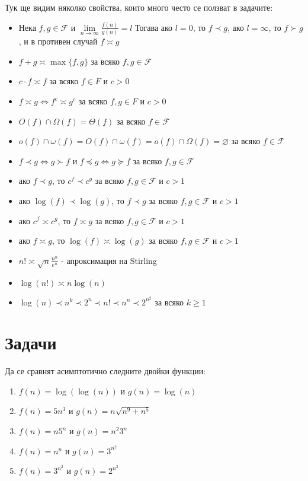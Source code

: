\documentclass{article}
\newcommand{\F}{\mathcal{F}}
\theoremstyle{definition}
\theoremstyle{plain}
\theoremstyle{remark}
\theoremstyle{definition}
\begin{document}
Тук ще видим няколко свойства, които много често се ползват в задачите:
\begin{itemize}
  \item Нека $f, g \in \F$ и $\lim\limits_{n \rightarrow \infty} \frac{f(n)}{g(n)} = l$
    Тогава ако $l = 0$, то $f \prec g$, ако $l = \infty$, то $f \succ g$, и в противен случай $f \asymp g$
  \item $f + g \asymp \max\{f, g\}$ за всяко $f, g \in \F$
  \item $c \cdot f \asymp f$ за всяко $f \in F$ и $c > 0$
  \item $f \asymp g \iff f^c \asymp g^c$ за всяко $f, g \in F$ и $c > 0$
  \item $O(f) \cap \Omega(f) = \Theta(f)$ за всяко $f \in \F$
  \item $o(f) \cap \omega(f) = O(f) \cap \omega(f) = o(f) \cap \Omega(f) = \varnothing$ за всяко $f \in \F$
  \item $f \prec g \iff g \succ f$ и $f \preceq g \iff g \succeq f$ за всяко $f, g \in \F$
  \item ако $f \prec g$, то $c^f \prec c^g$ за всяко $f, g \in \F$ и $c > 1$
  \item ако $\log(f) \prec \log(g)$, то $f \prec g$ за всяко $f, g \in \F$ и $c > 1$
  \item ако $c^f \asymp c^g$, то $f \asymp g$ за всяко $f, g \in \F$ и $c > 1$
  \item ако $f \asymp g$, то $\log(f) \asymp \log(g)$ за всяко $f, g \in \F$ и $c > 1$
  \item $n! \asymp \sqrt{n} \frac{n^n}{e^n}$ - апроксимация на Stirling
  \item $\log(n!) \asymp n \log(n)$
  \item $\log(n) \prec n^k \prec 2^n \prec n! \prec n^n \prec 2^{n^2}$ за всяко $k \geq 1$
\end{itemize}

\section*{Задачи}

Да се сравнят асимптотично следните двойки функции:
\begin{enumerate}
  \item $f(n) = \log(\log(n))$ и $g(n) = \log(n)$
  \item $f(n) = 5n^3$ и $g(n) = n \sqrt{n^9 + n^5}$
  \item $f(n) = n 5^n$ и $g(n) = n^ 2 3^n$
  \item $f(n) = n^n$ и $g(n) = 3^{n^2}$
  \item $f(n) = 3^{n^2}$ и $g(n) = 2^{n^3}$
\end{enumerate}
\end{document}
